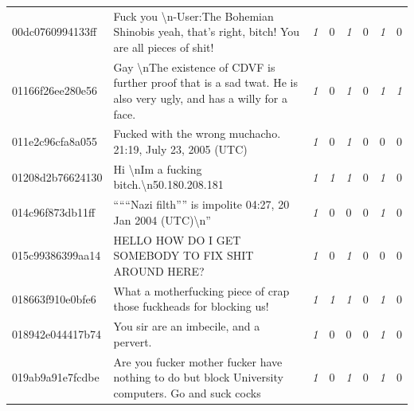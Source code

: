 \begin{table}[htb!]
{\begin{minipage}{0.88\textheight}
\begin{threeparttable}
\begin{tabularx}{\textwidth}{L{0.95} L{6.25} C{0.135} C{0.135} C{0.135} C{0.135} C{0.135} C{0.135}}
                    00dc0760994133ff & Fuck you \textbackslash n-User:The Bohemian Shinobis yeah, that's right, bitch! You are all pieces of shit!                      & \textit{1}  & 0           & \textit{1}  & 0           & \textit{1}  & 0           \\
                    01166f26ee280e56 & Gay \textbackslash nThe existence of CDVF is further proof that is a sad twat. He is also very ugly, and has a willy for a face. & \textit{1}  & 0           & \textit{1}  & 0           & \textit{1}  & \textit{1}  \\
                    011e2c96cfa8a055 & Fucked with the wrong muchacho. 21:19, July 23, 2005 (UTC)                                                                       & \textit{1}  & 0           & \textit{1}  & 0           & 0           & 0           \\
                    01208d2b76624130 & Hi \textbackslash nIm a fucking bitch.\textbackslash n50.180.208.181                                                             & \textit{1}  & \textit{1}  & \textit{1}  & 0           & \textit{1}  & 0           \\
                    014c96f873db11ff & ``````Nazi filth'''' is impolite 04:27, 20 Jan 2004 (UTC)\textbackslash n''                                                      & \textit{1}  & 0           & 0           & 0           & \textit{1}  & 0           \\
                    015c99386399aa14 & HELLO HOW DO I GET SOMEBODY TO FIX SHIT AROUND HERE?                                                                             & \textit{1}  & 0           & \textit{1}  & 0           & 0           & 0           \\
                    018663f910e0bfe6 & What a motherfucking piece of crap those fuckheads for blocking us!                                                              & \textit{1}  & \textit{1}  & \textit{1}  & 0           & \textit{1}  & 0           \\
                    018942e044417b74 & You sir are an imbecile, and a pervert.                                                                                          & \textit{1}  & 0           & 0           & 0           & \textit{1}  & 0           \\
                    019ab9a91e7fcdbe & Are you fucker mother fucker have nothing to do but block University computers. Go and suck cocks                                & \textit{1}  & 0           & \textit{1}  & 0           & \textit{1}  & 0           \\

\end{tabularx}
\end{threeparttable}
\end{minipage}}
\end{table}
